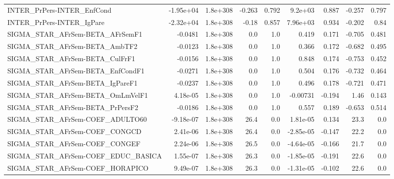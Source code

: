 \begin{tabular}{lrrrrrrrr}
INTER\_PrPers-INTER\_EnfCond            &   -1.95e+04 &     1.8e+308 &  -0.263 &    0.792 &    9.2e+03 &       0.887 &       -0.257 &         0.797 \\
INTER\_PrPers-INTER\_IgPare             &   -2.32e+04 &     1.8e+308 &   -0.18 &    0.857 &   7.96e+03 &       0.934 &       -0.202 &          0.84 \\
SIGMA\_STAR\_AFrSem-BETA\_AFrSemF1       &     -0.0481 &     1.8e+308 &     0.0 &      1.0 &      0.419 &       0.171 &       -0.705 &         0.481 \\
SIGMA\_STAR\_AFrSem-BETA\_AmbTF2         &     -0.0123 &     1.8e+308 &     0.0 &      1.0 &      0.366 &       0.172 &       -0.682 &         0.495 \\
SIGMA\_STAR\_AFrSem-BETA\_CulFrF1        &     -0.0156 &     1.8e+308 &     0.0 &      1.0 &      0.848 &       0.174 &       -0.753 &         0.452 \\
SIGMA\_STAR\_AFrSem-BETA\_EnfCondF1      &     -0.0271 &     1.8e+308 &     0.0 &      1.0 &      0.504 &       0.176 &       -0.732 &         0.464 \\
SIGMA\_STAR\_AFrSem-BETA\_IgPareF1       &     -0.0237 &     1.8e+308 &     0.0 &      1.0 &      0.496 &       0.178 &       -0.721 &         0.471 \\
SIGMA\_STAR\_AFrSem-BETA\_OmLmVelF1      &    4.18e-05 &     1.8e+308 &     0.0 &      1.0 &   -0.00731 &      -0.194 &         1.46 &         0.143 \\
SIGMA\_STAR\_AFrSem-BETA\_PrPersF2       &     -0.0186 &     1.8e+308 &     0.0 &      1.0 &      0.557 &       0.189 &       -0.653 &         0.514 \\
SIGMA\_STAR\_AFrSem-COEF\_ADULTO60       &   -9.18e-07 &     1.8e+308 &    26.4 &      0.0 &   1.81e-05 &       0.134 &         23.3 &           0.0 \\
SIGMA\_STAR\_AFrSem-COEF\_CONGCD         &    2.41e-06 &     1.8e+308 &    26.4 &      0.0 &  -2.85e-05 &      -0.147 &         22.2 &           0.0 \\
SIGMA\_STAR\_AFrSem-COEF\_CONGEF         &    2.24e-06 &     1.8e+308 &    26.5 &      0.0 &  -4.64e-05 &      -0.166 &         21.7 &           0.0 \\
SIGMA\_STAR\_AFrSem-COEF\_EDUC\_BASICA    &    1.55e-07 &     1.8e+308 &    26.3 &      0.0 &  -1.85e-05 &      -0.191 &         22.6 &           0.0 \\
SIGMA\_STAR\_AFrSem-COEF\_HORAPICO       &    9.49e-07 &     1.8e+308 &    26.3 &      0.0 &  -1.31e-05 &      -0.102 &         22.6 &           0.0 \\

\end{tabular}

